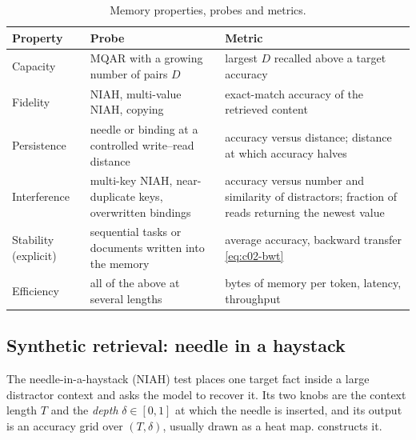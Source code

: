 \begin{table}[t]
\centering\small
\caption{Memory properties, probes and metrics.}
\label{tab:c02-eval-props}
\begin{tabularx}{\textwidth}{@{}>{\raggedright\arraybackslash}p{2.6cm}>{\raggedright\arraybackslash}X>{\raggedright\arraybackslash}X@{}}
\toprule
Property & Probe & Metric \\
\midrule
Capacity & MQAR with a growing number of pairs $D$ & largest $D$ recalled above a target accuracy \\
Fidelity & NIAH, multi-value NIAH, copying & exact-match accuracy of the retrieved content \\
Persistence & needle or binding at a controlled write--read distance & accuracy versus distance;
distance at which accuracy halves \\
Interference & multi-key NIAH, near-duplicate keys, overwritten bindings & accuracy versus number
and similarity of distractors; fraction of reads returning the newest value \\
Stability (explicit) & sequential tasks or documents written into the memory & average accuracy,
backward transfer \eqref{eq:c02-bwt} \\
Efficiency & all of the above at several lengths & bytes of memory per token, latency, throughput \\
\bottomrule
\end{tabularx}
\end{table}

\subsection{Synthetic retrieval: needle in a haystack}\label{sec:c02-niah}

The needle-in-a-haystack (NIAH) test \citep{c02-kamradt2023niah} places one target fact inside a
large distractor context and asks the model to recover it. Its two knobs are the context length
$T$ and the \emph{depth} $\delta\in[0,1]$ at which the needle is inserted, and its output is an
accuracy grid over $(T,\delta)$, usually drawn as a heat map.  constructs it.

